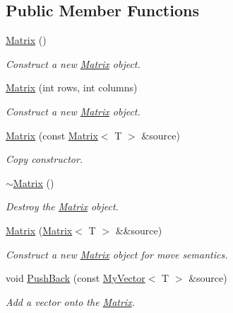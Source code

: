 \subsection*{Public Member Functions}
\begin{DoxyCompactItemize}
\item 
\mbox{\hyperlink{class_matrix_a9d567e3a121b1be0c3f9c461cab524fe}{Matrix}} ()
\begin{DoxyCompactList}\small\item\em Construct a new \mbox{\hyperlink{class_matrix}{Matrix}} object. \end{DoxyCompactList}\item 
\mbox{\hyperlink{class_matrix_a44eb4cf3a243fe027112d1ace474ead9}{Matrix}} (int rows, int columns)
\begin{DoxyCompactList}\small\item\em Construct a new \mbox{\hyperlink{class_matrix}{Matrix}} object. \end{DoxyCompactList}\item 
\mbox{\hyperlink{class_matrix_abc1e84ee28720ecc8a6807bb3f09f43e}{Matrix}} (const \mbox{\hyperlink{class_matrix}{Matrix}}$<$ T $>$ \&source)
\begin{DoxyCompactList}\small\item\em Copy constructor. \end{DoxyCompactList}\item 
\mbox{\hyperlink{class_matrix_a91aa704de674203e96aece9e1955ccd3}{$\sim$\+Matrix}} ()
\begin{DoxyCompactList}\small\item\em Destroy the \mbox{\hyperlink{class_matrix}{Matrix}} object. \end{DoxyCompactList}\item 
\mbox{\hyperlink{class_matrix_a0632d6b00522f3ce31684c07cb258440}{Matrix}} (\mbox{\hyperlink{class_matrix}{Matrix}}$<$ T $>$ \&\&source)
\begin{DoxyCompactList}\small\item\em Construct a new \mbox{\hyperlink{class_matrix}{Matrix}} object for move semantics. \end{DoxyCompactList}\item 
void \mbox{\hyperlink{class_matrix_af61aaa671b6bd354b27fb3aabbb65a9d}{Push\+Back}} (const \mbox{\hyperlink{class_my_vector}{My\+Vector}}$<$ T $>$ \&source)
\begin{DoxyCompactList}\small\item\em Add a vector onto the \mbox{\hyperlink{class_matrix}{Matrix}}. \end{DoxyCompactList}\item 

\end{DoxyCompactItemize}
